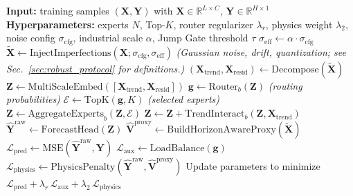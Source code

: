 \documentclass[review,1p,times]{elsarticle}
\begin{document}
\begin{algorithm}[t]
\caption{Ultra-LSNT training workflow with SCADA imperfection injection.}
\label{alg:train}
\begin{algorithmic}[1]
\STATE \textbf{Input:} training samples $(\mathbf{X},\mathbf{Y})$ with $\mathbf{X}\in\mathbb{R}^{L\times C}$, $\mathbf{Y}\in\mathbb{R}^{H\times 1}$
\STATE \textbf{Hyperparameters:} experts $N$, Top-$K$, router regularizer $\lambda_r$, physics weight $\lambda_2$, noise config $\sigma_{\mathrm{cfg}}$, industrial scale $\alpha$, Jump Gate threshold $\tau$
\STATE $\sigma_{\mathrm{eff}} \leftarrow \alpha \cdot \sigma_{\mathrm{cfg}}$
\STATE $\tilde{\mathbf{X}} \leftarrow \mathrm{InjectImperfections}(\mathbf{X}; \sigma_{\mathrm{cfg}},\sigma_{\mathrm{eff}})$
\STATE \hspace{1em}\textit{(Gaussian noise, drift, quantization; see Sec.~\ref{sec:robust_protocol} for definitions.)}
\STATE $(\mathbf{X}_{\mathrm{trend}},\mathbf{X}_{\mathrm{resid}}) \leftarrow \mathrm{Decompose}(\tilde{\mathbf{X}})$
\STATE $\mathbf{Z} \leftarrow \mathrm{MultiScaleEmbed}([\mathbf{X}_{\mathrm{trend}},\mathbf{X}_{\mathrm{resid}}])$
 \STATE $\mathbf{g}\leftarrow \mathrm{Router}_b(\mathbf{Z})$ \hspace{1em}\textit{(routing probabilities)}
 \STATE $\mathcal{E}\leftarrow \mathrm{TopK}(\mathbf{g},K)$ \hspace{1em}\textit{(selected experts)}
 \STATE $\mathbf{Z}\leftarrow \mathrm{AggregateExperts}_b(\mathbf{Z},\mathcal{E})$
 \STATE $\mathbf{Z}\leftarrow \mathbf{Z} + \mathrm{TrendInteract}_b(\mathbf{Z},\mathbf{X}_{\mathrm{trend}})$
\ENDFOR
\STATE $\hat{\mathbf{Y}}^{\mathrm{raw}} \leftarrow \mathrm{ForecastHead}(\mathbf{Z})$
\STATE $\hat{\mathbf{V}}^{\mathrm{proxy}} \leftarrow \mathrm{BuildHorizonAwareProxy}(\tilde{\mathbf{X}})$
\STATE $\mathcal{L}_{\mathrm{pred}} \leftarrow \mathrm{MSE}(\hat{\mathbf{Y}}^{\mathrm{raw}},\mathbf{Y})$
\STATE $\mathcal{L}_{\mathrm{aux}} \leftarrow \mathrm{LoadBalance}(\mathbf{g})$
\STATE $\mathcal{L}_{\mathrm{physics}} \leftarrow \mathrm{PhysicsPenalty}(\hat{\mathbf{Y}}^{\mathrm{raw}},\hat{\mathbf{V}}^{\mathrm{proxy}})$
\STATE Update parameters to minimize $\mathcal{L}_{\mathrm{pred}} + \lambda_r\,\mathcal{L}_{\mathrm{aux}} + \lambda_2\,\mathcal{L}_{\mathrm{physics}}$
\end{algorithmic}
\end{algorithm}
\end{document}
